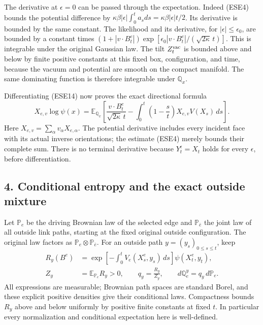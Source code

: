 \documentclass[11pt]{article}
\begin{document}
The derivative at \(\epsilon=0\) can be passed through the expectation. Indeed (ESE4) bounds the potential difference by
\(\kappa\beta|\epsilon|\int_0^t a_sds=\kappa\beta|\epsilon|t/2\).
Its derivative is bounded by the same constant. The likelihood and its derivative, for \(|\epsilon|\le\epsilon_0\), are bounded by a constant times
\((1+|v\cdot B_t^e|)
\exp[\epsilon_0|v\cdot B_t^e|/(\sqrt{2\kappa}\,t)]\).
This is integrable under the original Gaussian law. The tilt \(Z_t^{\rm vac}\) is bounded above and below by finite positive constants at this fixed box, configuration, and time, because the vacuum and potential are smooth on the compact manifold. The same dominating function is therefore integrable under \(\mathbb Q_x\).

Differentiating (ESE14) now proves the exact directional formula
\[
 \boxed{\displaystyle
 X_{e,v}\log\psi(x)=
 \mathbb E_{\mathbb Q_x}\!\left[
  \frac{v\cdot B_t^e}{\sqrt{2\kappa}\,t}
  -\int_0^t\left(1-\frac{s}{t}\right)
                         X_{e,v}V(X_s)\,ds\right].}
 \tag{ESE15}
\]
Here \(X_{e,v}=\sum_\alpha v_\alpha X_{e,\alpha}\). The potential derivative includes every incident face with its actual inverse orientations; the estimate (ESE4) merely bounds their complete sum. There is no terminal derivative because \(Y_t^\epsilon=X_t\) holds for every \(\epsilon\), before differentiation.

\subsection*{4. Conditional entropy and the exact outside mixture}

Let \(\mathbb P_e\) be the driving Brownian law of the selected edge and \(\mathbb P_{\bar e}\) the joint law of all outside link paths, starting at the fixed original outside configuration. The original law factors as \(\mathbb P_e\otimes\mathbb P_{\bar e}\). For an outside path \(y=(y_s)_{0\le s\le t}\), keep
\[
 \begin{aligned}
 R_y(B^e)
   &=\exp\left[-\int_0^t
                  V_e(X_s^e,y_s)\,ds\right]\psi(X_t^e,y_t),\\
 Z_y&=\mathbb E_{\mathbb P_e}R_y>0,\qquad
 q_y=\frac{R_y}{Z_y},\qquad
 d\mathbb Q_e^y=q_y\,d\mathbb P_e.
 \end{aligned}\tag{ESE16}
\]
All expressions are measurable; Brownian path spaces are standard Borel, and these explicit positive densities give their conditional laws. Compactness bounds \(R_y\) above and below uniformly by positive finite constants at fixed \(t\). In particular every normalization and conditional expectation here is well-defined.
\end{document}
